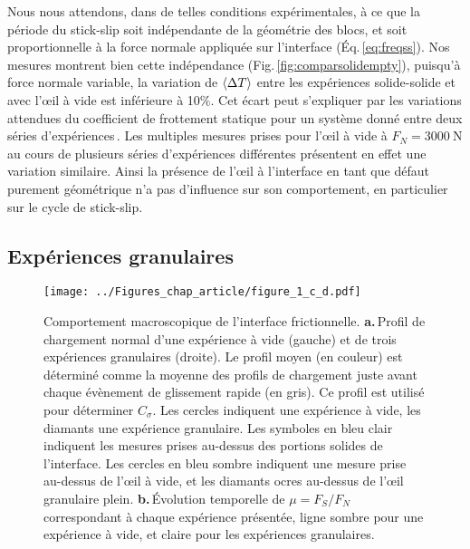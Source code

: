 Nous nous attendons, dans de telles conditions expérimentales, à ce que la période du stick-slip soit indépendante de la géométrie des blocs, et soit proportionnelle à la force normale appliquée sur l'interface (Éq.\,\ref{eq:freqss}). Nos mesures montrent bien cette indépendance (Fig.\,\ref{fig:comparsolidempty}), puisqu'à force normale variable, la variation de $\left\langle {\Delta T} \right\rangle$ entre les expériences solide-solide et avec l'œil à vide est inférieure à 10\%. Cet écart peut s'expliquer par les variations
attendues du coefficient de frottement statique pour un système donné entre deux séries d'expériences\,\cite{ben-david_static_2011}.
Les multiples mesures prises pour l'œil à vide à $F_N=\SI{3000}{\newton}$ au cours de plusieurs séries d'expériences différentes présentent en effet une variation similaire. Ainsi la présence de l'œil à l'interface en tant que défaut purement géométrique n'a pas d'influence sur son comportement, en particulier sur le cycle de stick-slip.

\newpage

\subsection{Expériences granulaires}

\begin{figure}[htb]
\centering
\texttt{[image: ../Figures\_chap\_article/figure\_1\_c\_d.pdf]}
\caption[Contraste de chargement $C_\sigma$]{Comportement macroscopique de l'interface frictionnelle. \textbf{a.}\,Profil de chargement normal d'une expérience à vide (gauche) et de trois expériences granulaires (droite). Le profil moyen (en couleur) est déterminé comme la moyenne des profils de chargement juste avant chaque évènement de glissement rapide (en gris). Ce profil est utilisé pour déterminer $C_\sigma$. Les cercles indiquent une expérience à vide, les diamants une expérience granulaire. Les symboles en bleu clair indiquent les mesures prises au-dessus des portions solides de l'interface. Les cercles en bleu sombre indiquent une mesure prise au-dessus de l'œil à vide, et les diamants ocres au-dessus de l'œil granulaire plein. \textbf{b.}\,Évolution temporelle de $\mu=F_S/F_N$ correspondant à chaque expérience présentée, ligne sombre pour une expérience à vide, et claire pour les expériences granulaires.}
\label{fig:loadingcontrast}
\end{figure}



